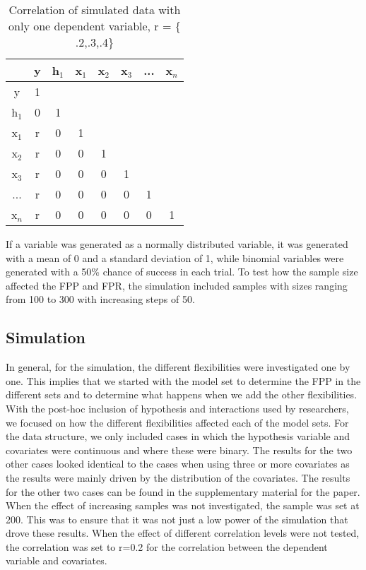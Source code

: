 \begin{table}
\caption{}
\centering
\caption*{\footnotesize Correlation of simulated data with only one dependent variable, r = $\{$.2,.3,.4$\}$}
\begin{tabular}{c|ccccccc} 
\toprule
 & y & h${}_{1}$ & x${}_{1}$ & x${}_{2}$ & x${}_{3}$ & ... & x${}_{n}$ \\ 
 \midrule
y & 1 &  &  &  &  &  &  \\ 
h${}_{1}$ & 0 & 1 &  &  &  &  &  \\ 
x${}_{1}$ & r & 0 & 1 &  &  &  &  \\  
x${}_{2}$ & r & 0 & 0 & 1 &  &  &  \\  
x${}_{3}$ & r & 0 & 0 & 0 & 1 &  &  \\  
... & r & 0 & 0 & 0 & 0 & 1 &  \\ 
x${}_{n}$ & r & 0 & 0 & 0 & 0 & 0 & 1 \\ 
\bottomrule
\end{tabular}
\end{table}


If a variable was generated as a normally distributed variable, it was generated with a mean of 0 and a standard deviation of 1, while binomial variables were generated with a 50\% chance of success in each trial. To test how the sample size affected the FPP and FPR, the simulation included samples with sizes ranging from 100 to 300 with increasing steps of 50. 

\subsection{Simulation}
In general, for the simulation, the different flexibilities were investigated one by one. This implies that we started with the model set to determine the FPP in the different sets and to determine what happens when we add the other flexibilities. With the post-hoc inclusion of hypothesis and interactions used by researchers, we focused on how the different flexibilities affected each of the model sets. For the data structure, we only included cases in which the hypothesis variable and covariates were continuous and where these were binary. The results for the two other cases looked identical to the cases when using three or more covariates as the results were mainly driven by the distribution of the covariates. The results for the other two cases can be found in the supplementary material for the paper. When the effect of increasing samples was not investigated, the sample was set at 200. This was to ensure that it was not just a low power of the simulation that drove these results. When the effect of different correlation levels were not tested, the correlation was set to r=0.2 for the correlation between the dependent variable and covariates.\\

